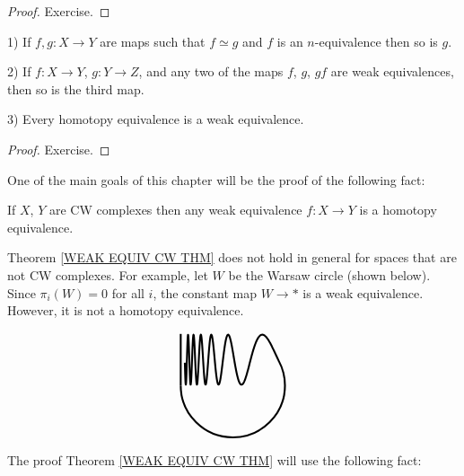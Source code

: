 \begin{proof}
Exercise.
\end{proof}




\begin{proposition}
\label{WE PROPERTIES PROP}
1) If $f, g\colon X\to Y$ are maps such that $f\simeq g$ and $f$ is 
an $n$-equivalence then so is $g$. 

2) If $f\colon X\to Y$, $g\colon Y \to Z$, and any two of the maps $f$, $g$, $gf$
are weak equivalences, then so is the third map. 

3) Every homotopy equivalence is a weak equivalence. 
\end{proposition}

\begin{proof}
Exercise.
\end{proof}




One of the main goals of this chapter will be the proof of the following fact: 

\begin{theorem}
\label{WEAK EQUIV CW THM}
If $X$, $Y$ are CW complexes then any weak equivalence $f\colon X\to Y$ is a homotopy 
equivalence.
\end{theorem}


\begin{note}
Theorem \ref{WEAK EQUIV CW THM} does not hold in general for spaces that are not 
CW complexes. For example, let $W$ be the Warsaw circle (shown below). Since 
$\pi_{i}(W) = 0$ for all $i$, the constant map $W \to \ast$ is a weak equivalence.  
However, it is not a homotopy equivalence.

\begin{equation*}
\begin{tikzpicture}[scale =0.7] 
\draw[line width = 1.5] (2.1, -1.03) -- (2.1, 1.03);
\begin{scope}
\draw[xscale=15, line width = 1.5 , domain= 0.151:0.40123,smooth,variable=\x, samples = 400] plot ({\x},{sin(pow(\x, -2) r)});
\end{scope}
\draw[line width = 1.5] (2.1, -1.03) arc [radius = 2.0772, start angle = 180, end angle = 388.15];

\end{tikzpicture}
\end{equation*}
\end{note}


The proof Theorem \ref{WEAK EQUIV CW THM} will use the following fact:


